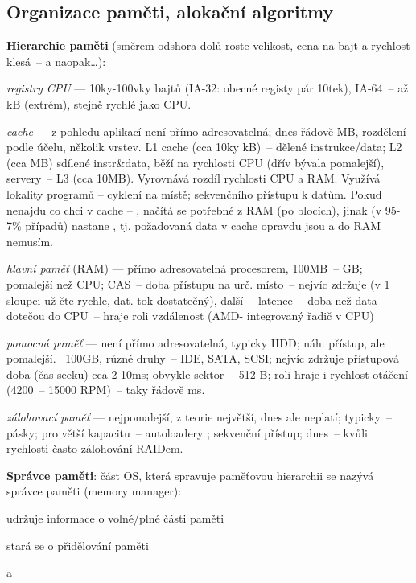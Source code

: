 \subsection{Organizace paměti, alokační algoritmy}

\textbf{Hierarchie paměti} (směrem odshora dolů roste velikost, cena na bajt a rychlost klesá~-- a naopak\dots):
\begin{pitemize}
    \item \emph{registry CPU} --- 10ky-100vky bajtů (IA-32: obecné registy pár 10tek), IA-64~-- až kB (extrém), stejně rychlé jako CPU. 
    \item \emph{cache} --- z pohledu aplikací není přímo adresovatelná; dnes řádově MB, rozdělení podle účelu, několik vrstev. L1 cache (cca 10ky kB)~-- dělené instrukce/data; L2 (cca MB) sdílené instr\&data, běží na rychlosti CPU (dřív bývala pomalejší), servery~-- L3 (cca 10MB). Vyrovnává rozdíl rychlosti CPU a RAM. Využívá lokality programů -- cyklení na místě; sekvenčního přístupu k datům. Pokud nenajdu co chci v cache -- , načítá se potřebné z RAM (po blocích), jinak (v 95-7\% případů) nastane , tj. požadovaná data v cache opravdu jsou a do RAM nemusím.
    \item \emph{hlavní paměť} (RAM) --- přímo adresovatelná procesorem, 100MB~-- GB; pomalejší než CPU; CAS~-- doba přístupu na urč. místo~-- nejvíc zdržuje (v 1 sloupci už čte rychle, dat. tok dostatečný), další~-- latence~-- doba než data dotečou do CPU~-- hraje roli vzdálenost (AMD- integrovaný řadič v CPU) 
    \item \emph{pomocná paměť} --- není přímo adresovatelná, typicky HDD; náh. přístup, ale pomalejší. ~100GB, různé druhy~-- IDE, SATA, SCSI; nejvíc zdržuje přístupová doba (čas seeku) cca 2-10ms; obvykle sektor~-- 512 B; roli hraje i rychlost otáčení (4200~-- 15000 RPM)~-- taky řádově ms. 
    \item \emph{zálohovací paměť} --- nejpomalejší, z teorie největší, dnes ale neplatí; typicky~-- pásky; pro větší kapacitu~-- autoloadery ; sekvenční přístup; dnes~-- kvůli rychlosti často zálohování RAIDem.
\end{pitemize}

\textbf{Správce paměti}: část OS, která spravuje paměťovou hierarchii se nazývá\\správce paměti (memory manager):
\begin{pitemize}
	\item udržuje informace o volné/plné části paměti
	\item stará se o přidělování paměti
	\item a 
\end{pitemize}


